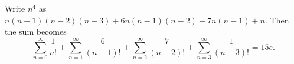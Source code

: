 Write $n^4$ as $n\left(n-1\right)\left(n-2\right)\left(n-3\right)+6n\left(n-1\right)\left(n-2\right)+7n\left(n-1\right)+n$. Then the sum becomes \[\displaystyle\sum_{n=0}^{\infty}\frac{1}{n!}+\displaystyle\sum_{n=1}^{\infty}\frac{6}{\left(n-1\right)!}+\displaystyle\sum_{n=2}^{\infty}\frac{7}{\left(n-2\right)!}+\displaystyle\sum_{n=3}^{\infty}\frac{1}{\left(n-3\right)!}=\boxed{15e}.\]